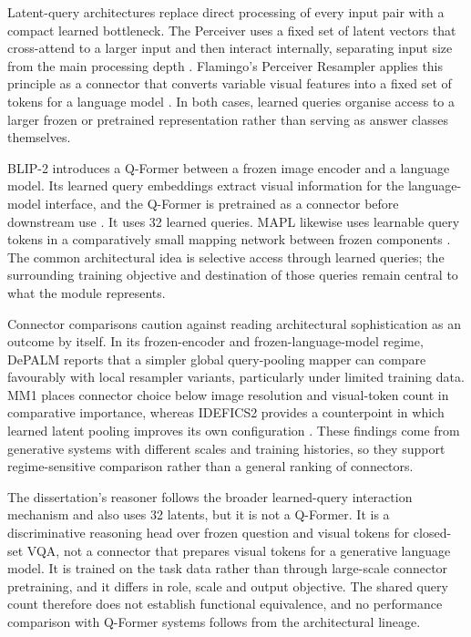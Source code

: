 Latent-query architectures replace direct processing of every input pair with a compact learned bottleneck. The Perceiver uses a fixed set of latent vectors that cross-attend to a larger input and then interact internally, separating input size from the main processing depth \citep{jaegle2021perceiver}. Flamingo's Perceiver Resampler applies this principle as a connector that converts variable visual features into a fixed set of tokens for a language model \citep{alayrac2022flamingo}. In both cases, learned queries organise access to a larger frozen or pretrained representation rather than serving as answer classes themselves.

BLIP-2 introduces a Q-Former between a frozen image encoder and a language model. Its learned query embeddings extract visual information for the language-model interface, and the Q-Former is pretrained as a connector before downstream use \citep{li2023blip2}. It uses 32 learned queries. MAPL likewise uses learnable query tokens in a comparatively small mapping network between frozen components \citep{manas2023mapl}. The common architectural idea is selective access through learned queries; the surrounding training objective and destination of those queries remain central to what the module represents.

Connector comparisons caution against reading architectural sophistication as an outcome by itself. In its frozen-encoder and frozen-language-model regime, DePALM reports that a simpler global query-pooling mapper can compare favourably with local resampler variants, particularly under limited training data. MM1 places connector choice below image resolution and visual-token count in comparative importance, whereas IDEFICS2 provides a counterpoint in which learned latent pooling improves its own configuration \citep{vallaeys2024depalm,mckinzie2024mm1,laurencon2024idefics2}. These findings come from generative systems with different scales and training histories, so they support regime-sensitive comparison rather than a general ranking of connectors.

The dissertation's reasoner follows the broader learned-query interaction mechanism and also uses 32 latents, but it is not a Q-Former. It is a discriminative reasoning head over frozen question and visual tokens for closed-set VQA, not a connector that prepares visual tokens for a generative language model. It is trained on the task data rather than through large-scale connector pretraining, and it differs in role, scale and output objective. The shared query count therefore does not establish functional equivalence, and no performance comparison with Q-Former systems follows from the architectural lineage.

